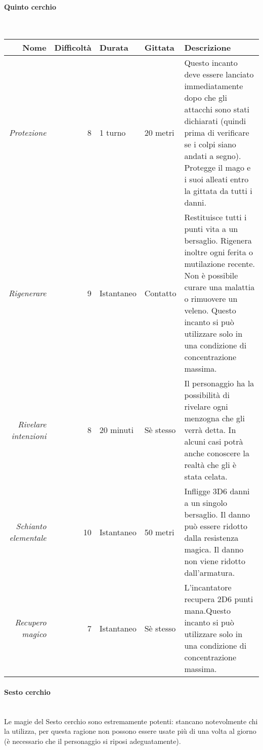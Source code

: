 \documentclass[../manuale_main.tex]{subfiles}
\begin{document}
\paragraph{Quinto cerchio}\mbox{}\\

\begin{tabularx}{\linewidth}{|N| D| T| G| Y|}
\hline
\textbf{Nome} & \textbf{Difficoltà} & \textbf{Durata} & \textbf{Gittata} & \textbf{Descrizione} \\ \hline\hline
\textit{Protezione} & 8 & 1 turno & 20 metri &Questo incanto deve essere lanciato immediatamente dopo che gli attacchi sono stati dichiarati (quindi prima di verificare se i colpi siano andati a segno). Protegge il mago e i suoi alleati entro la gittata da tutti i danni.  \\ \hline
\textit{Rigenerare} & 9 &Istantaneo  & Contatto  & Restituisce tutti i punti vita a un bersaglio. Rigenera inoltre ogni ferita o mutilazione recente. Non è possibile curare una malattia o rimuovere un veleno. Questo incanto si può utilizzare solo in una condizione di concentrazione massima.\\ \hline
\textit{Rivelare intenzioni} & 8 & 20 minuti & Sè stesso &Il personaggio ha la possibilità di rivelare ogni menzogna che gli verrà detta. In alcuni casi potrà anche conoscere la realtà che gli è stata celata.  \\ \hline
\textit{Schianto elementale} & 10  & Istantaneo & 50 metri &Infligge 3D6 danni a un singolo bersaglio. Il danno può essere ridotto dalla resistenza magica. Il danno non viene ridotto dall'armatura.\\ \hline
\textit{Recupero magico} & 7 & Istantaneo & Sè stesso & L'incantatore recupera 2D6 punti mana.Questo incanto si può utilizzare solo in una condizione di concentrazione massima.\\
\hline
\end{tabularx}

\paragraph{Sesto cerchio}\mbox{}\\

Le magie del Sesto cerchio sono estremamente potenti: stancano notevolmente chi la utilizza, per questa ragione non possono essere usate più di una volta al giorno (è necessario che il personaggio si riposi adeguatamente).
\end{document}
